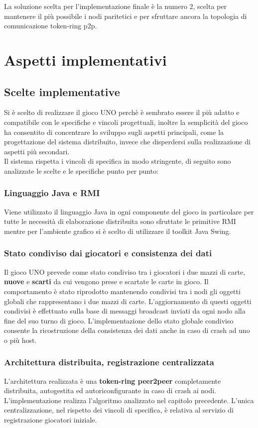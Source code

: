 \documentclass[10pt,a4paper]{article}
\begin{document}
La soluzione scelta per l'implementazione finale è la numero 2, scelta per mantenere il più possibile i nodi paritetici e per sfruttare ancora la topologia di comunicazione token-ring p2p. 

\section{Aspetti implementativi}
\subsection{Scelte implementative}
Si è scelto di realizzare il gioco UNO perchè è sembrato essere il più adatto e compatibile con le specifiche e vincoli progettuali, inoltre la semplicità del gioco ha consentito di concentrare lo sviluppo sugli aspetti principali, come la progettazione del sistema distribuito, invece che disperdersi sulla realizzazione di aspetti più secondari.\\
Il sistema rispetta i vincoli di specifica in modo stringente, di seguito sono analizzate le scelte e le specifiche punto per punto:

\subsubsection{Linguaggio Java e RMI}
Viene utilizzato il linguaggio Java in ogni componente del gioco in particolare per tutte le necessità di elaborazione distribuita sono sfruttate le primitive RMI mentre per l'ambiente grafico si è scelto di utilizzare il toolkit Java Swing.

\subsubsection{Stato condiviso dai giocatori e consistenza dei dati}
Il gioco UNO prevede come stato condiviso tra i giocatori i due mazzi di carte, \textbf{nuove} e \textbf{scarti} da cui vengono prese e scartate le carte in gioco. Il comportamento è stato riprodotto mantenendo condivisi tra i nodi gli oggetti globali che rappresentano i due mazzi di carte. L'aggiornamento di questi oggetti condivisi è effettuato sulla base di messaggi broadcast inviati da ogni nodo alla fine del suo turno di gioco. L'implementazione dello stato globale condiviso consente la ricostruzione della consistenza dei dati anche in caso di crash ad uno o più host.
 
\subsubsection{Architettura distribuita, registrazione centralizzata}
L'architettura realizzata è una \textbf{token-ring peer2peer} completamente distribuita, autogestita ed autoriconfigurante in caso di crash ai nodi. L'implementazione realizza l'algoritmo analizzato nel capitolo precedente. L'unica centralizzazione, nel rispetto dei vincoli di specifica, è relativa al servizio di registrazione giocatori iniziale.
\end{document}
